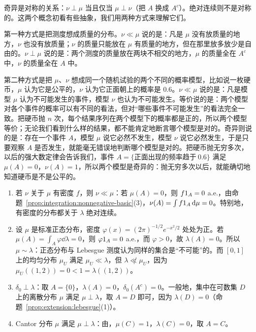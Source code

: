 奇异是对称的关系：$\nu\perp\mu$ 当且仅当 $\mu\perp\nu$（把 $A$ 换成 $A^c$）。绝对连续则不是对称的。这两个概念初看有些抽象，我们用两种方式来理解它们。

第一种方式是把测度想成质量的分布。$\nu\ll\mu$ 说的是：凡是 $\mu$ 没有放质量的地方，$\nu$ 也没有放质量；$\nu$ 的质量只能放在 $\mu$ 有质量的地方，但在那里放多放少是自由的。$\nu\perp\mu$ 说的是：两个测度的质量放在两块不相交的地方，$\mu$ 的质量全在 $A^c$ 中，$\nu$ 的质量全在 $A$ 中。

第二种方式是把 $\mu$、$\nu$ 想成同一个随机试验的两个不同的概率模型，比如说一枚硬币，$\mu$ 认为它是公平的，$\nu$ 认为它正面朝上的概率是 $0.6$。$\nu\ll\mu$ 说的是：凡是模型 $\mu$ 认为不可能发生的事件，模型 $\nu$ 也认为不可能发生。等价说的是：两个模型对各个事件的概率可以有不同的看法，但对“哪些事件不可能发生”的看法完全一致。把硬币抛 $n$ 次，每个结果序列在两个模型下的概率都是正的，所以两个模型等价；无论我们看到什么样的结果，都不能肯定地断言哪个模型是对的。奇异则说的是：存在一个事件 $A$，模型 $\mu$ 说它必然不发生，模型 $\nu$ 说它必然发生，于是只要观察 $A$ 是否发生，就能毫无错误地判断哪个模型是对的。把硬币抛无穷多次，以后的强大数定律会告诉我们，事件 $A=\{\text{正面出现的频率趋于}\ 0.6\}$ 满足 $\mu(A)=0$，$\nu(A)=1$，所以两个模型是奇异的：抛无穷多次以后，就能确切地知道硬币是不是公平的。

\begin{example}\label{ex:ac:examples}
\begin{enumerate}
\item 若 $\nu$ 关于 $\mu$ 有密度 $f$，则 $\nu\ll\mu$：若 $\mu(A)=0$，则 $f1_A=0$ a.e.，由命题~\ref{prop:integration:nonnegative-basic}(3)，$\nu(A)=\int f1_A\,\mathrm{d}\mu=0$。特别地，有密度的分布都关于 $\lambda$ 绝对连续。
\item 设 $\mu$ 是标准正态分布，密度 $\varphi(x)=(2\pi)^{-1/2}e^{-x^2/2}$ 处处为正。若 $\mu(A)=\int_A\varphi\dd\lambda=0$，则 $\varphi1_A=0$ a.e.，而 $\varphi>0$，故 $\lambda(A)=0$。所以 $\mu\sim\lambda$：正态分布与 Lebesgue 测度认为同样的集合是“不可能”的。而 $[0,1]$ 上的均匀分布 $\mu_U$ 满足 $\mu_U\ll\lambda$，但 $\lambda\not\ll\mu_U$，因为 $\mu_U((1,2))=0<1=\lambda((1,2))$。
\item $\delta_0\perp\lambda$：取 $A=\{0\}$，$\lambda(A)=0$，$\delta_0(A^c)=0$。一般地，集中在可数集 $D$ 上的离散分布 $\mu$ 满足 $\mu\perp\lambda$，取 $A=D$ 即可，因为 $\lambda(D)=0$（命题~\ref{prop:extension:lebesgue}(1)）。
\item Cantor 分布 $\mu$ 满足 $\mu\perp\lambda$：由，$\mu(C)=1$，$\lambda(C)=0$，取 $A=C$。
\end{enumerate}
\end{example}

